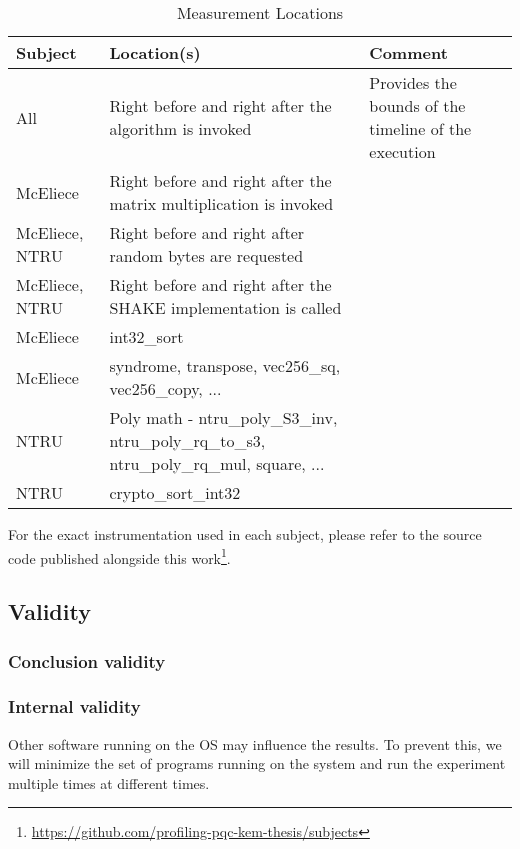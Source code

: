 \begin{table}[H]
    \centering
    \begin{tabular}{l|p{3cm}|p{3cm}}
        Subject & Location(s) & Comment \\
        \hline
        All & Right before and right after the algorithm is invoked & Provides the bounds of the timeline of the execution \\
        McEliece & Right before and right after the matrix multiplication is invoked & \\
        McEliece, NTRU & Right before and right after random bytes are requested & \\
        McEliece, NTRU & Right before and right after the SHAKE implementation is called & \\
        McEliece & int32_sort & \\
        McEliece & syndrome, transpose, vec256_sq, vec256_copy, ... &\\
        NTRU & Poly math - ntru_poly_S3_inv, ntru_poly_rq_to_s3, ntru_poly_rq_mul, square, ...& \\
        NTRU & crypto_sort_int32 & \\
    \end{tabular}
    \caption{Measurement Locations}
    \label{table:method:instrumentation}
\end{table}

For the exact instrumentation used in each subject, please refer to the source code published alongside this work\footnote{\href{https://github.com/profiling-pqc-kem-thesis/subjects}{https://github.com/profiling-pqc-kem-thesis/subjects}}.

\subsection{Validity}

\subsubsection{Conclusion validity}

\subsubsection{Internal validity}
\label{section:method:internal-validity}

Other software running on the OS may influence the results. To prevent this, we will minimize the set of programs running on the system and run the experiment multiple times at different times.

